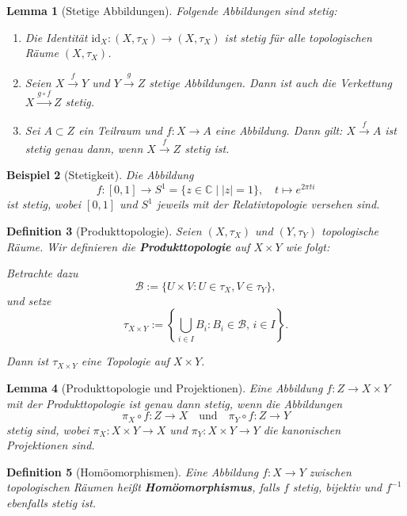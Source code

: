 \documentclass[a4paper,12pt]{article}
\theoremstyle{break}
\newtheorem{definition}{Definition}[section]
\newtheorem{example}[definition]{Beispiel}
\newtheorem{lemma}[definition]{Lemma}
\begin{document}
\begin{lemma}[Stetige Abbildungen]
Folgende Abbildungen sind stetig:
\begin{enumerate}
    \item Die Identität $\text{id}_X : (X, \tau_X) \to (X, \tau_X)$ ist stetig für alle topologischen Räume $(X, \tau_X)$.
    
    \item Seien $X \xrightarrow{f} Y$ und $Y \xrightarrow{g} Z$ stetige Abbildungen. Dann ist auch die Verkettung $X \xrightarrow{g \circ f} Z$ stetig.
    
    \item Sei $A \subset Z$ ein Teilraum und $f : X \to A$ eine Abbildung. Dann gilt: $X \xrightarrow{f} A$ ist stetig genau dann, wenn $X \xrightarrow{f} Z$ stetig ist.
\end{enumerate}
\end{lemma}

\begin{example}[Stetigkeit]
Die Abbildung 
\[
f : [0,1] \to S^1 = \{z \in \mathbb{C} \mid |z| = 1\}, \quad t \mapsto e^{2\pi t i}
\]
ist stetig, wobei $[0,1]$ und $S^1$ jeweils mit der Relativtopologie versehen sind.
\end{example}

\begin{definition}[Produkttopologie]
Seien $(X, \tau_X)$ und $(Y, \tau_Y)$ topologische Räume. Wir definieren die \textbf{Produkttopologie} auf $X \times Y$ wie folgt:

Betrachte dazu 
\[
\mathcal{B} := \{U \times V : U \in \tau_X, V \in \tau_Y\},
\]
und setze 
\[
\tau_{X \times Y} := \left\{\bigcup_{i \in I} B_i : B_i \in \mathcal{B}, \, i \in I\right\}.
\]

Dann ist $\tau_{X \times Y}$ eine Topologie auf $X \times Y$.
\end{definition}

\begin{lemma}[Produkttopologie und Projektionen]
Eine Abbildung $f : Z \to X \times Y$ mit der Produkttopologie ist genau dann stetig, wenn die Abbildungen 
\[
\pi_X \circ f : Z \to X \quad \text{und} \quad \pi_Y \circ f : Z \to Y
\]
stetig sind, wobei $\pi_X : X \times Y \to X$ und $\pi_Y : X \times Y \to Y$ die kanonischen Projektionen sind.
\end{lemma}

\begin{definition}[Homöomorphismen]
Eine Abbildung $f : X \to Y$ zwischen topologischen Räumen heißt \textbf{Homöomorphismus}, falls $f$ stetig, bijektiv und $f^{-1}$ ebenfalls stetig ist.
\end{definition}
\end{document}
